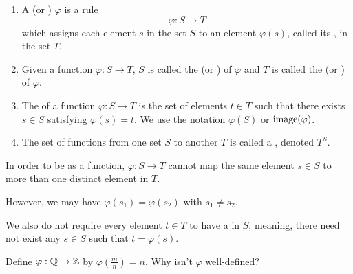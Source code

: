\documentclass[../UNABRIDGEDalgebraNotesMSRI-UP2016.tex]{subfiles}
\begin{document}
\begin{frame}
\begin{dfn}
\begin{enumerate}
\item A  (or ) $\varphi$ is a rule
\[
\varphi:S\to T
\] 
which assigns each element $s$ in the set $S$ to an element $\varphi(s)$, called its , in the set $T$.  
\item Given a function $\varphi:S\to T$, $S$ is called the  (or ) of $\varphi$ and $T$ is called the  (or ) of $\varphi$.  
\item The  of a function $\varphi:S\to T$ is the set of elements $t\in T$ such that there exists $s\in S$ satisfying $\varphi(s)=t$.  We use the notation $\varphi(S)$ or $\operatorname{image}(\varphi)$.
\item The set of functions from one set $S$ to another $T$ is called a , denoted $T^S$.
\end{enumerate}
\end{dfn}
\end{frame}

\begin{frame}[c]{}{}
In order to be  as a function, $\varphi:S\to T$ cannot map the same element $s\in S$ to more than one distinct element in $T$.  

\smallGap
However, we may have $\varphi(s_1)=\varphi(s_2)$ with $s_1\neq s_2$.  

\smallGap
We also do not require every element $t\in T$ to have a  in $S$, meaning, there need not exist any $s\in S$ such that $t=\varphi(s)$.

\smallGap
\begin{ex}
Define $\varphi: \mathbb Q\to \mathbb Z$ by $\varphi(\frac{m}{n})=n$.  Why isn't $\varphi$ well-defined?
\end{ex}
\end{frame}
\end{document}
